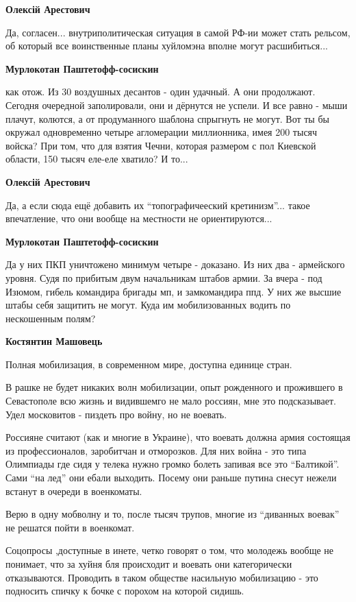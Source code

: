 \begin{itemize}
\begin{itemize}
\textbf{Олексій Арестович} 

Да, согласен... внутриполитическая ситуация в самой РФ-ии может стать рельсом,
об который все воинственные планы хуйломэна вполне могут расшибиться...

\textbf{Мурлокотан Паштетофф-сосискин} 

\obeycr
как отож.
Из 30 воздушных десантов - один удачный.
А они продолжают.
Сегодня очередной заполировали, они и дёрнутся не успели.
И все равно - мыши плачут, колются, а от продуманного шаблона спрыгнуть не могут.
Вот ты бы окружал одновременно четыре агломерации миллионника, имея 200 тысяч войска?
При том, что для взятия Чечни, которая размером с пол Киевской области, 150 тысяч еле-еле хватило? И то...
\restorecr

\textbf{Олексій Арестович} 

Да, а если сюда ещё добавить их \enquote{топографичееский кретинизм}... такое
впечатление, что они вообще на местности не ориентируются...

\textbf{Мурлокотан Паштетофф-сосискин}

\obeycr
Да у них ПКП уничтожено минимум четыре - доказано.
Из них два - армейского уровня. Судя по прибитым двум начальникам штабов армии.
За вчера - под Изюмом, гибель командира бригады мп, и замкомандира ппд.
У них же высшие штабы себя защитить не могут.
Куда им мобилизованных водить по нескошенным полям?
\restorecr

\textbf{Костянтин Машовець} 

Полная мобилизация, в современном мире, доступна единице стран.

В рашке не будет никаких волн мобилизации, опыт рожденного и прожившего в
Севастополе всю жизнь и видившемго не мало россиян, мне это подсказывает. Удел
московитов - пиздеть про войну, но не воевать.

Россияне считают (как и многие в Украине), что воевать должна армия состоящая из
профессионалов, заробитчан и отморозков. Для них война - это типа Олимпиады где
сидя у телека нужно громко болеть запивая все это \enquote{Балтикой}. Сами \enquote{на лед} они
ебали выходить. Посему они раньше путина снесут нежели встанут в очереди в
военкоматы.

Верю в одну мобволну и то, после тысяч трупов, многие из \enquote{диванных
воевак} не решатся пойти в военкомат.

Соцопросы ,доступные в инете, четко говорят о том, что молодежь вообще не
понимает, что за хуйня бля происходит и воевать они категорически отказываются.
Проводить в таком обществе насильную мобилизацию - это подносить спичку к бочке
с порохом на которой сидишь.


\end{itemize}
\end{itemize}
